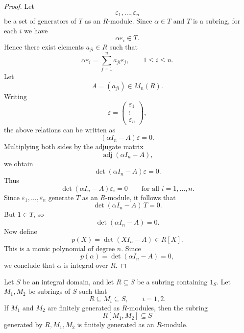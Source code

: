 \begin{proof}
    Let
    \[
        \varepsilon_1,\dots,\varepsilon_n
    \]
    be a set of generators of \(T\) as an \(R\)-module. Since \(\alpha\in T\) and \(T\)
    is a subring, for each \(i\) we have
    \[
        \alpha \varepsilon_i\in T.
    \]
    Hence there exist elements \(a_{ji}\in R\) such that
    \[
        \alpha\varepsilon_i
        =
        \sum_{j=1}^n a_{ji}\varepsilon_j,
        \qquad 1\le i\le n.
    \]
    Let
    \[
        A=(a_{ji})\in M_n(R).
    \]
    Writing
    \[
        \varepsilon=
        \begin{pmatrix}
            \varepsilon_1 \\
            \vdots        \\
            \varepsilon_n
        \end{pmatrix},
    \]
    the above relations can be written as
    \[
        (\alpha I_n-A)\varepsilon=0.
    \]
    Multiplying both sides by the adjugate matrix
    \[
        \operatorname{adj}(\alpha I_n-A),
    \]
    we obtain
    \[
        \det(\alpha I_n-A)\varepsilon=0.
    \]
    Thus
    \[
        \det(\alpha I_n-A)\varepsilon_i=0
        \qquad
        \text{for all } i=1,\dots,n.
    \]
    Since \(\varepsilon_1,\dots,\varepsilon_n\) generate \(T\) as an \(R\)-module, it follows that
    \[
        \det(\alpha I_n-A)\,T=0.
    \]
    But \(1\in T\), so
    \[
        \det(\alpha I_n-A)=0.
    \]
    Now define
    \[
        p(X)=\det(XI_n-A)\in R[X].
    \]
    This is a monic polynomial of degree \(n\). Since
    \[
        p(\alpha)=\det(\alpha I_n-A)=0,
    \]
    we conclude that \(\alpha\) is integral over \(R\).
\end{proof}

\begin{lemma}
    Let \(S\) be an integral domain, and let \(R\subseteq S\) be a subring containing
    \(1_S\). Let \(M_1,M_2\) be subrings of \(S\) such that
    \[
        R\subseteq M_i\subseteq S,
        \qquad i=1,2.
    \]
    If \(M_1\) and \(M_2\) are finitely generated as \(R\)-modules, then the subring
    \[
        R[M_1,M_2]\subseteq S
    \]
    generated by \(R,M_1,M_2\) is finitely generated as an \(R\)-module.
\end{lemma}

